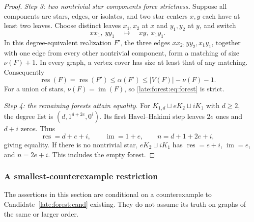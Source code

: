 \documentclass[11pt,a4paper]{article}
\theoremstyle{definition}\newtheorem{definition}[theorem]{Definition}
\theoremstyle{remark}\newtheorem{remark}[theorem]{Remark}
\newcommand{\res}{\operatorname{res}}
\newcommand{\im}{\operatorname{im}}
\begin{document}
\begin{proof}
\medskip\noindent\emph{Step 3: two nontrivial star components force strictness.}
Suppose all components are stars, edges, or isolates, and two star centers
$x,y$ each have at least two leaves. Choose distinct leaves $x_1,x_2$ at $x$
and $y_1,y_2$ at $y$, and switch
\[
xx_1,\ yy_1\quad\longmapsto\quad xy,\ x_1y_1.
\]
In this degree-equivalent realization $F'$, the three edges
$xx_2,yy_2,x_1y_1$, together with one edge from every other nontrivial
component, form a matching of size $\nu(F)+1$. In every graph, a vertex cover
has size at least that of any matching. Consequently
\[
\res(F)=\res(F')\le\alpha(F')\le |V(F)|-\nu(F)-1.
\]
For a union of stars, $\nu(F)=\im(F)$, so \eqref{late:forest:eq:forest} is strict.

\medskip\noindent\emph{Step 4: the remaining forests attain equality.}
For $K_{1,d}\sqcup eK_2\sqcup iK_1$ with $d\ge2$, the degree list is
$(d,1^{d+2e},0^i)$. Its first Havel--Hakimi step leaves $2e$ ones and $d+i$
zeros. Thus
\[
\res=d+e+i,\qquad \im=1+e,\qquad n=d+1+2e+i,
\]
giving equality. If there is no nontrivial star, $eK_2\sqcup iK_1$ has
$\res=e+i$, $\im=e$, and $n=2e+i$. This includes the empty forest.
\end{proof}

\subsubsection{A smallest-counterexample restriction}

The assertions in this section are conditional on a counterexample to
Candidate~\ref{late:forest:cand} existing. They do not assume its truth on graphs of the
same or larger order.
\end{document}
